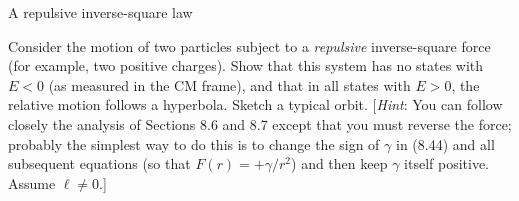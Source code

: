 \documentclass[11pt,letterpaper,boxed]{../hmcpsetrhino}
\begin{document}
\newpage

\begin{problem}[iii]
A repulsive inverse-square law

\begin{problem}[8.13]
Consider the motion of two particles subject to a \textit{repulsive} inverse-square force (for example, two positive charges). Show that this system has no states with  $E < 0$ (as measured in the CM frame), and that in all states with $E > 0$, the relative motion follows a hyperbola. Sketch a typical orbit. [\textit{Hint}: You can follow closely the analysis of Sections 8.6 and 8.7 except that you must reverse the force; probably the simplest way to do this is to change the sign of $\gamma$ in (8.44) and all subsequent equations (so that $F(r) = +\gamma/r^2$) and then keep $\gamma$ itself positive. Assume $\ell \neq 0$.]
\end{problem}
\end{problem}

\begin{solution}

\vfill
\end{solution}
\end{document}
